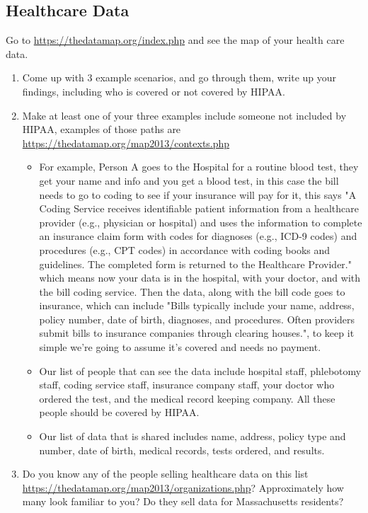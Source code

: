 \documentclass[12pt]{article}
\begin{document}
\subsection*{Healthcare Data}
Go to \url{https://thedatamap.org/index.php} and see the map of your health care data.  
\begin{enumerate}
    \item Come up with 3 example scenarios, and go through them, write up your findings, including who is covered or not covered by HIPAA.  
    \item Make at least one of your three examples include someone not included by HIPAA, examples of those paths are \url{https://thedatamap.org/map2013/contexts.php}
        \begin{itemize}
            \item For example, Person A goes to the Hospital for a routine blood test, they get your name and info and you get a blood test, in this case the bill needs to go to coding to see if your insurance will pay for it, this says "A Coding Service receives identifiable patient information from a healthcare provider (e.g., physician or hospital) and uses the information to complete an insurance claim form with codes for diagnoses (e.g., ICD-9 codes) and procedures (e.g., CPT codes) in accordance with coding books and guidelines. The completed form is returned to the Healthcare Provider." which means now your data is in the hospital, with your doctor, and with the bill coding service. Then the data, along with the bill code goes to insurance, which can include "Bills typically include your name, address, policy number, date of birth, diagnoses, and procedures. Often providers submit bills to insurance companies through clearing houses.", to keep it simple we're going to assume it's covered and needs no payment. 
            \item Our list of people that can see the data include hospital staff, phlebotomy staff, coding service staff, insurance company staff, your doctor who ordered the test, and the medical record keeping company. All these people should be covered by HIPAA. 
            \item Our list of data that is shared includes name, address, policy type and number, date of birth, medical records, tests ordered, and results.
        \end{itemize}
    \item Do you know any of the people selling healthcare data on this list \url{https://thedatamap.org/map2013/organizations.php}? Approximately how many look familiar to you?  Do they sell data for Massachusetts residents?    
\end{enumerate}
\end{document}

